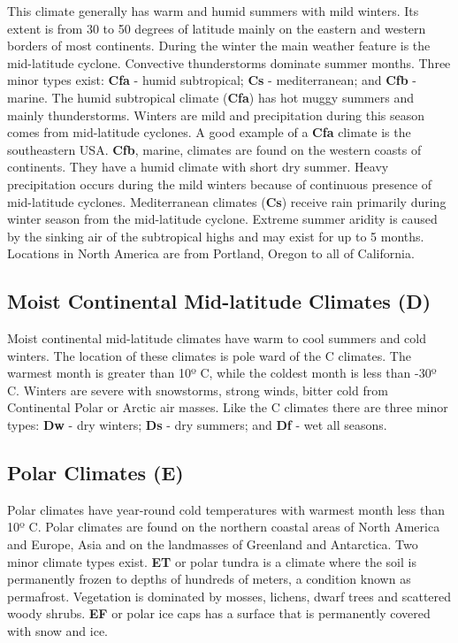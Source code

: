 This climate generally has warm and humid summers with mild winters. Its extent is from 30 to 50 degrees of latitude mainly on the eastern and western borders of most continents. During the winter the main weather feature is the mid-latitude cyclone. Convective thunderstorms dominate summer months. Three minor types exist: \textbf{Cfa} - humid subtropical; \textbf{Cs} - mediterranean; and \textbf{Cfb} - marine. The humid subtropical climate (\textbf{Cfa}) has hot muggy summers and mainly thunderstorms. Winters are mild and precipitation during this season comes from mid-latitude cyclones. A good example of a \textbf{Cfa} climate is the southeastern USA. \textbf{Cfb}, marine, climates are found on the western coasts of continents. They have a humid climate with short dry summer. Heavy precipitation occurs during the mild winters because of continuous presence of mid-latitude cyclones. Mediterranean climates (\textbf{Cs}) receive rain primarily during winter season from the mid-latitude cyclone. Extreme summer aridity is caused by the sinking air of the subtropical highs and may exist for up to 5 months. Locations in North America are from Portland, Oregon to all of California.

\subsection{Moist Continental Mid-latitude Climates (D)}\label{moist-continental-mid-latitude-climates-d}

Moist continental mid-latitude climates have warm to cool summers and cold winters. The location of these climates is pole ward of the C climates. The warmest month is greater than 10º C, while the coldest month is less than -30º C. Winters are severe with snowstorms, strong winds, bitter cold from Continental Polar or Arctic air masses. Like the C climates there are three minor types: \textbf{Dw} - dry winters; \textbf{Ds} - dry summers; and \textbf{Df} - wet all seasons.

\subsection{Polar Climates (E)}\label{polar-climates-e}

Polar climates have year-round cold temperatures with warmest month less than 10º C. Polar climates are found on the northern coastal areas of North America and Europe, Asia and on the landmasses of Greenland and Antarctica. Two minor climate types exist. \textbf{ET} or polar tundra is a climate where the soil is permanently frozen to depths of hundreds of meters, a condition known as permafrost. Vegetation is dominated by mosses, lichens, dwarf trees and scattered woody shrubs. \textbf{EF} or polar ice caps has a surface that is permanently covered with snow and ice.

